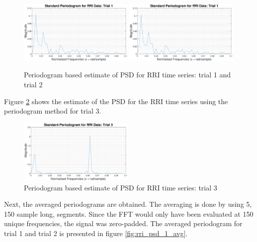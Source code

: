 \documentclass{article}
\begin{document}
\begin{figure}[H]
    \centering
    \includegraphics[width=0.49\textwidth]{std_periodogram_rri_trial_1}
    \includegraphics[width=0.49\textwidth]{std_periodogram_rri_trial_1}
    \caption{Periodogram based estimate of PSD for RRI time series: trial 1 and trial 2}
    \label{fig:rri_psd_1}
\end{figure}

Figure \ref{fig:rri_psd_2} shows the estimate of the PSD for the RRI time series using the periodogram method for trial 3.

\begin{figure}[H]
    \centering
    \includegraphics[width=0.49\textwidth]{std_periodogram_rri_trial_3}
    \caption{Periodogram based estimate of PSD for RRI time series: trial 3}
    \label{fig:rri_psd_2}
\end{figure}

Next, the averaged periodograms are obtained. The averaging is done by using 5, 150 sample long, segments. Since the FFT would only have been evaluated at 150 unique frequencies, the signal was zero-padded. The averaged periodogram for trial 1 and trial 2 is presented in figure \ref{fig:rri_psd_1_avg}.
\end{document}
